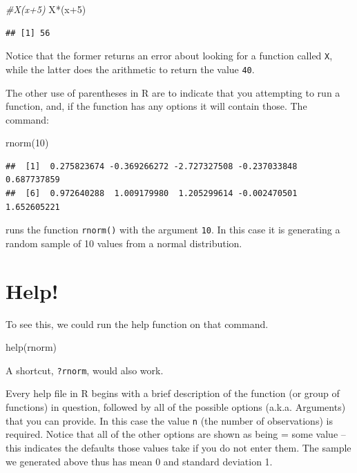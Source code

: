 \documentclass[
]{book}
\newenvironment{Shaded}{\begin{snugshade}}{\end{snugshade}}
\newcommand{\CommentTok}[1]{\textcolor[rgb]{0.56,0.35,0.01}{\textit{#1}}}
\newcommand{\DecValTok}[1]{\textcolor[rgb]{0.00,0.00,0.81}{#1}}
\newcommand{\FunctionTok}[1]{\textcolor[rgb]{0.00,0.00,0.00}{#1}}
\newcommand{\NormalTok}[1]{#1}
\newcommand{\SpecialCharTok}[1]{\textcolor[rgb]{0.00,0.00,0.00}{#1}}
\begin{document}
\begin{Shaded}
\begin{Highlighting}[]
\CommentTok{\#X(x+5)}
\NormalTok{X}\SpecialCharTok{*}\NormalTok{(x}\SpecialCharTok{+}\DecValTok{5}\NormalTok{)}
\end{Highlighting}
\end{Shaded}

\begin{verbatim}
## [1] 56
\end{verbatim}

Notice that the former returns an error about looking for a function called \texttt{X}, while the latter does the arithmetic to return the value \texttt{40}.

The other use of parentheses in R are to indicate that you attempting to run a function, and, if the function has any options it will contain those. The command:

\begin{Shaded}
\begin{Highlighting}[]
\FunctionTok{rnorm}\NormalTok{(}\DecValTok{10}\NormalTok{)}
\end{Highlighting}
\end{Shaded}

\begin{verbatim}
##  [1]  0.275823674 -0.369266272 -2.727327508 -0.237033848  0.687737859
##  [6]  0.972640288  1.009179980  1.205299614 -0.002470501  1.652605221
\end{verbatim}

runs the function \texttt{rnorm()} with the argument \texttt{10}. In this case it is generating a random sample of 10 values from a normal distribution.

\hypertarget{help}{%
\section{Help!}\label{help}}

To see this, we could run the help function on that command.

\begin{Shaded}
\begin{Highlighting}[]
\FunctionTok{help}\NormalTok{(rnorm)}
\end{Highlighting}
\end{Shaded}

A shortcut, \texttt{?rnorm}, would also work.

Every help file in R begins with a brief description of the function (or group of functions) in question, followed by all of the possible options (a.k.a. Arguments) that you can provide. In this case the value \texttt{n} (the number of observations) is required. Notice that all of the other options are shown as being = some value -- this indicates the defaults those values take if you do not enter them. The sample we generated above thus has mean 0 and standard deviation 1.
\end{document}
